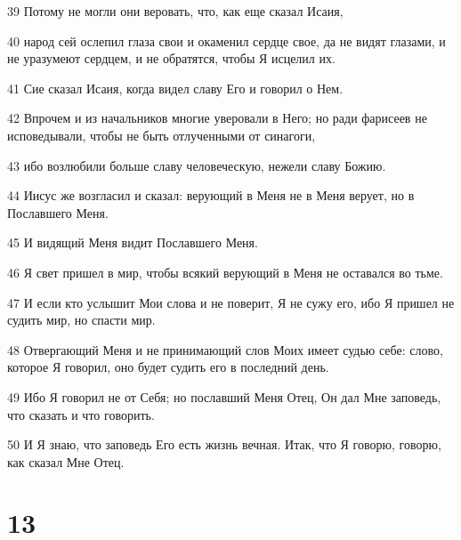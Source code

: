 \par 39 Потому не могли они веровать, что, как еще сказал Исаия,
\par 40 народ сей ослепил глаза свои и окаменил сердце свое, да не видят глазами, и не уразумеют сердцем, и не обратятся, чтобы Я исцелил их.
\par 41 Сие сказал Исаия, когда видел славу Его и говорил о Нем.
\par 42 Впрочем и из начальников многие уверовали в Него; но ради фарисеев не исповедывали, чтобы не быть отлученными от синагоги,
\par 43 ибо возлюбили больше славу человеческую, нежели славу Божию.
\par 44 Иисус же возгласил и сказал: верующий в Меня не в Меня верует, но в Пославшего Меня.
\par 45 И видящий Меня видит Пославшего Меня.
\par 46 Я свет пришел в мир, чтобы всякий верующий в Меня не оставался во тьме.
\par 47 И если кто услышит Мои слова и не поверит, Я не сужу его, ибо Я пришел не судить мир, но спасти мир.
\par 48 Отвергающий Меня и не принимающий слов Моих имеет судью себе: слово, которое Я говорил, оно будет судить его в последний день.
\par 49 Ибо Я говорил не от Себя; но пославший Меня Отец, Он дал Мне заповедь, что сказать и что говорить.
\par 50 И Я знаю, что заповедь Его есть жизнь вечная. Итак, что Я говорю, говорю, как сказал Мне Отец.

\chapter{13}

